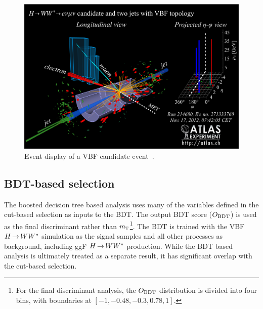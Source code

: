 \begin{figure}[h!]
  \centering
  \captionsetup{justification=centering}
  \includegraphics[width=\textwidth]{figures/eventdisplay}

  \caption{Event display of a VBF candidate event~\cite{WW2015}.}
  \label{fig:eventdisplay}
\end{figure}                                                                                     


\subsection{BDT-based selection}
\label{sec:vbf_bdt_def}
The boosted decision tree based analysis uses many of the variables defined in the cut-based selection as inputs to the BDT. The output BDT score ($O_{\rm BDT}$) is used as the final discriminant rather than $m_{\textrm{\footnotesize\sc t}}$\footnote{For the final discriminant analysis, the $O_{\rm BDT}$ distribution is divided into four bins, with boundaries at $[-1, -0.48, -0.3, 0.78, 1]$.}. The BDT is trained with the VBF $H{\,{\rightarrow}\,}WW^\ast$ simulation as the signal samples and all other processes as background, including ggF $H{\,{\rightarrow}\,}WW^\ast$ production. While the BDT based analysis is ultimately treated as a separate result, it has significant overlap with the cut-based selection. 

